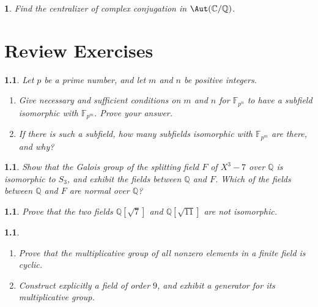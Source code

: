 \documentclass[a4paper,11pt,final,openany]{memoir}
\newtheorem{exercise}[Y]{}
\theoremstyle{nonumberplain}
\begin{document}
\begin{exercise}
\label{x91} Find the centralizer of complex conjugation in $\Aut(\mathbb{C}%
{}/\mathbb{Q}{})$.
\end{exercise}

\appendix\clearpage


\chapter{Review Exercises}

\renewcommand{\theY}{A-\arabic{Y}}

\begin{exercise}
\label{x24}Let $p$ be a prime number, and let $m$ and $n$ be positive integers.

\begin{enumerate}
\item Give necessary and sufficient conditions on $m$ and $n$ for
$\mathbb{F}_{p^{n}}$ to have a subfield isomorphic with $\mathbb{F}_{p^{m}}$.
Prove your answer.

\item If there is such a subfield, how many subfields isomorphic with
$\mathbb{F}_{p^{m}}$ are there, and why?
\end{enumerate}
\end{exercise}

\begin{exercise}
\label{x25} Show that the Galois group of the splitting field $F$ of $X^{3}-7$
over ${\mathbb{Q}}$ is isomorphic to $S_{3}$, and exhibit the fields between
${\mathbb{Q}}$ and $F$. Which of the fields between ${\mathbb{Q}}$ and $F$ are
normal over ${\mathbb{Q}}$?
\end{exercise}

\begin{exercise}
\label{x26} Prove that the two fields ${\mathbb{Q}}[\sqrt7]$ and ${\mathbb{Q}%
}[\sqrt{11}]$ are not isomorphic.
\end{exercise}

\begin{exercise}
\label{x27}

\begin{enumerate}
\item Prove that the multiplicative group of all nonzero elements in a finite
field is cyclic.

\item Construct explicitly a field of order $9$, and exhibit a generator for
its multiplicative group.
\end{enumerate}
\end{exercise}
\end{document}
